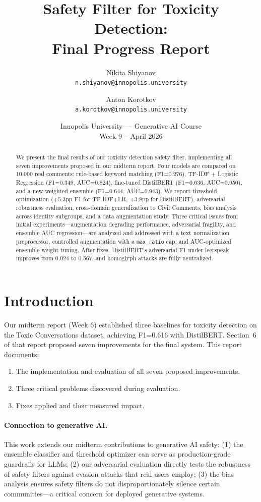 \documentclass[11pt,a4paper]{article}
\title{Safety Filter for Toxicity Detection:\\Final Progress Report}
\author{
  Nikita Shiyanov\\\texttt{n.shiyanov@innopolis.university}
  \and
  Anton Korotkov\\\texttt{a.korotkov@innopolis.university}
}
\date{Innopolis University --- Generative AI Course\\Week 9 -- April 2026}
\begin{document}
\maketitle

\begin{abstract}
We present the final results of our toxicity detection safety filter, implementing all seven improvements proposed in our midterm report.
Four models are compared on 10,000 real comments: rule-based keyword matching (F1=0.276), TF-IDF + Logistic Regression (F1=0.349, AUC=0.824), fine-tuned DistilBERT (F1=0.636, AUC=0.950), and a new weighted ensemble (F1=0.644, AUC=0.943).
We report threshold optimization (+5.3pp F1 for TF-IDF+LR, +3.8pp for DistilBERT), adversarial robustness evaluation, cross-domain generalization to Civil Comments, bias analysis across identity subgroups, and a data augmentation study.
Three critical issues from initial experiments---augmentation degrading performance, adversarial fragility, and ensemble AUC regression---are analyzed and addressed with a text normalization preprocessor, controlled augmentation with a \texttt{max\_ratio} cap, and AUC-optimized ensemble weight tuning.
After fixes, DistilBERT's adversarial F1 under leetspeak improves from 0.024 to 0.567, and homoglyph attacks are fully neutralized.
\end{abstract}

\section{Introduction}

Our midterm report (Week 6) established three baselines for toxicity detection on the Toxic Conversations dataset, achieving F1=0.616 with DistilBERT.
Section~6 of that report proposed seven improvements for the final system.
This report documents:
\begin{enumerate}[nosep]
  \item The implementation and evaluation of all seven proposed improvements.
  \item Three critical problems discovered during evaluation.
  \item Fixes applied and their measured impact.
\end{enumerate}

\paragraph{Connection to generative AI.}
This work extends our midterm contributions to generative AI safety:
(1) the ensemble classifier and threshold optimizer can serve as production-grade guardrails for LLMs;
(2) our adversarial evaluation directly tests the robustness of safety filters against evasion attacks that real users employ;
(3) the bias analysis ensures safety filters do not disproportionately silence certain communities---a critical concern for deployed generative systems.
\end{document}
